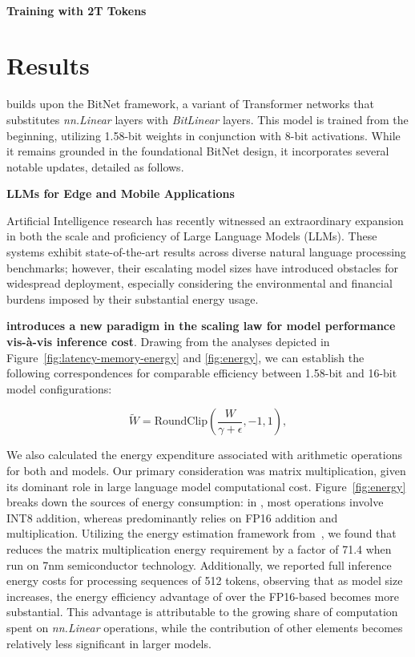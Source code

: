 \paragraph{Training with 2T Tokens}

\section{Results}

 builds upon the BitNet framework, a variant of Transformer networks that substitutes \emph{nn.Linear} layers with \emph{BitLinear} layers. This model is trained from the beginning, utilizing 1.58-bit weights in conjunction with 8-bit activations. While it remains grounded in the foundational BitNet design, it incorporates several notable updates, detailed as follows.

\textbf{LLMs for Edge and Mobile Applications}

Artificial Intelligence research has recently witnessed an extraordinary expansion in both the scale and proficiency of Large Language Models (LLMs). These systems exhibit state-of-the-art results across diverse natural language processing benchmarks; however, their escalating model sizes have introduced obstacles for widespread deployment, especially considering the environmental and financial burdens imposed by their substantial energy usage.

\textbf{ introduces a new paradigm in the scaling law for model performance vis-à-vis inference cost}. Drawing from the analyses depicted in Figure~\ref{fig:latency-memory-energy} and \ref{fig:energy}, we can establish the following correspondences for comparable efficiency between 1.58-bit and 16-bit model configurations:

\begin{equation}
    \widetilde{W} = \mathrm{RoundClip}(\frac{W}{\gamma + \epsilon}, -1, 1),
\end{equation}

We also calculated the energy expenditure associated with arithmetic operations for both  and  models. Our primary consideration was matrix multiplication, given its dominant role in large language model computational cost. Figure~\ref{fig:energy} breaks down the sources of energy consumption: in , most operations involve INT8 addition, whereas  predominantly relies on FP16 addition and multiplication. Utilizing the energy estimation framework from~\cite{energycost, pokebnn}, we found that  reduces the matrix multiplication energy requirement by a factor of 71.4 when run on 7nm semiconductor technology. Additionally, we reported full inference energy costs for processing sequences of 512 tokens, observing that as model size increases, the energy efficiency advantage of  over the FP16-based  becomes more substantial. This advantage is attributable to the growing share of computation spent on \emph{nn.Linear} operations, while the contribution of other elements becomes relatively less significant in larger models.

